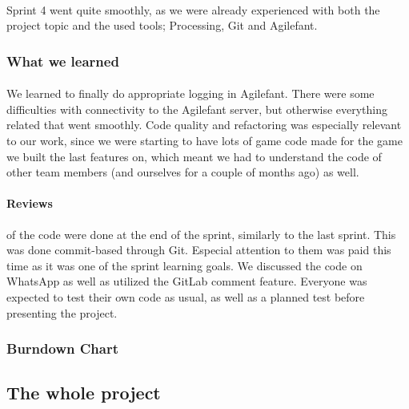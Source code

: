 \paragraph{} Sprint 4 went quite smoothly, as we were already experienced with both the project topic and the used tools; Processing, Git and Agilefant.

\subsubsection{What we learned}

\paragraph{} We learned to finally do appropriate logging in Agilefant. There were some difficulties with connectivity to the Agilefant server, but otherwise everything related that went smoothly. Code quality and refactoring was especially relevant to our work, since we were starting to have lots of game code made for the game we built the last features on, which meant we had to understand the code of other team members (and ourselves for a couple of months ago) as well.

\paragraph{Reviews} of the code were done at the end of the sprint, similarly to the last sprint. This was done commit-based through Git. Especial attention to them was paid this time as it was one of the sprint learning goals. We discussed the code on WhatsApp as well as utilized the GitLab comment feature. Everyone was expected to test their own code as usual, as well as a planned test before presenting the project.

\subsubsection{Burndown Chart}

\subsection{The whole project}

